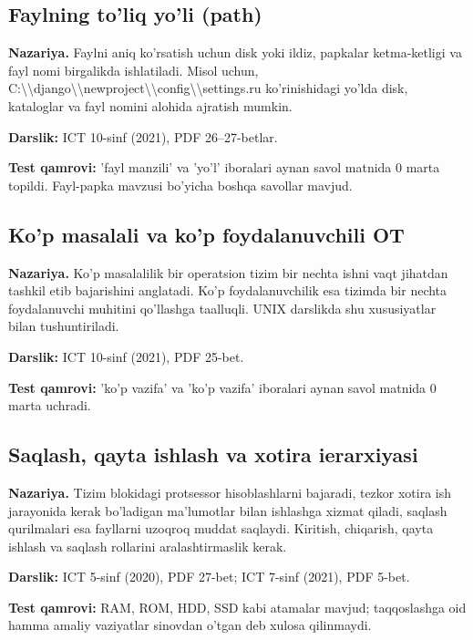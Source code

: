 \documentclass[10pt,a4paper]{article}
\begin{document}
\subsection{Faylning to'liq yo'li (path)}
\textbf{Nazariya.} Faylni aniq ko'rsatish uchun disk yoki ildiz, papkalar ketma-ketligi va fayl nomi birgalikda ishlatiladi. Misol uchun, C:\textbackslash{}\textbackslash{}django\textbackslash{}\textbackslash{}newproject\textbackslash{}\textbackslash{}config\textbackslash{}\textbackslash{}settings.ru ko'rinishidagi yo'lda disk, kataloglar va fayl nomini alohida ajratish mumkin.
\par\textbf{Darslik:} ICT 10-sinf (2021), PDF 26--27-betlar.
\par\textbf{Test qamrovi:} 'fayl manzili' va 'yo'l' iboralari aynan savol matnida 0 marta topildi. Fayl-papka mavzusi bo'yicha boshqa savollar mavjud.
\subsection{Ko'p masalali va ko'p foydalanuvchili OT}
\textbf{Nazariya.} Ko'p masalalilik bir operatsion tizim bir nechta ishni vaqt jihatdan tashkil etib bajarishini anglatadi. Ko'p foydalanuvchilik esa tizimda bir nechta foydalanuvchi muhitini qo'llashga taalluqli. UNIX darslikda shu xususiyatlar bilan tushuntiriladi.
\par\textbf{Darslik:} ICT 10-sinf (2021), PDF 25-bet.
\par\textbf{Test qamrovi:} 'ko'p vazifa' va 'ko'p vazifa' iboralari aynan savol matnida 0 marta uchradi.
\subsection{Saqlash, qayta ishlash va xotira ierarxiyasi}
\textbf{Nazariya.} Tizim blokidagi protsessor hisoblashlarni bajaradi, tezkor xotira ish jarayonida kerak bo'ladigan ma'lumotlar bilan ishlashga xizmat qiladi, saqlash qurilmalari esa fayllarni uzoqroq muddat saqlaydi. Kiritish, chiqarish, qayta ishlash va saqlash rollarini aralashtirmaslik kerak.
\par\textbf{Darslik:} ICT 5-sinf (2020), PDF 27-bet; ICT 7-sinf (2021), PDF 5-bet.
\par\textbf{Test qamrovi:} RAM, ROM, HDD, SSD kabi atamalar mavjud; taqqoslashga oid hamma amaliy vaziyatlar sinovdan o'tgan deb xulosa qilinmaydi.
\end{document}
